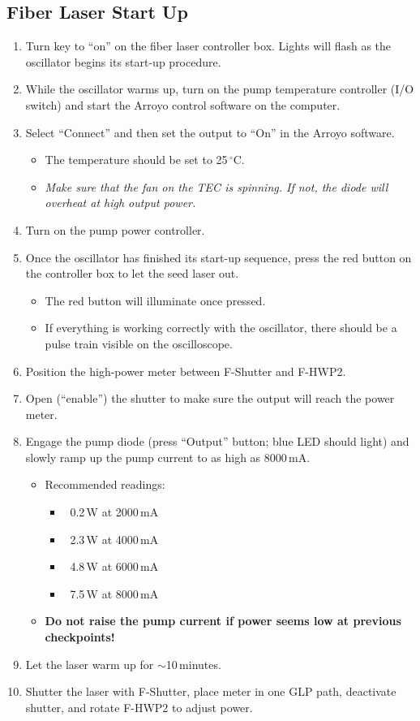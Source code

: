 \documentclass{article}
\begin{document}
\subsection{Fiber Laser Start Up}
\begin{enumerate}
  \item Turn key to ``on'' on the fiber laser controller box. Lights will flash as the oscillator begins its start-up procedure.
  \item While the oscillator warms up, turn on the pump temperature controller (I/O switch) and start the Arroyo control software on the computer.
  \item Select ``Connect'' and then set the output to ``On'' in the Arroyo software.
    \begin{itemize}
      \item The temperature should be set to 25\,$^\circ$C.
      \item \textit{Make sure that the fan on the TEC is spinning. If not, the diode will overheat at high output power.}
    \end{itemize}
  \item Turn on the pump power controller.
  \item Once the oscillator has finished its start-up sequence, press the red button on the controller box to let the seed laser out.
    \begin{itemize}
      \item The red button will illuminate once pressed.
      \item If everything is working correctly with the oscillator, there should be a pulse train visible on the oscilloscope.
    \end{itemize}
  \item Position the high-power meter between F-Shutter and F-HWP2.
  \item Open (``enable'') the shutter to make sure the output will reach the power meter.
  \item Engage the pump diode (press ``Output'' button; blue LED should light) and slowly ramp up the pump current to as high as 8000\,mA.
    \begin{itemize}
      \item Recommended readings:
      \begin{itemize}
        \item ~0.2\,W at 2000\,mA
        \item ~2.3\,W at 4000\,mA
        \item ~4.8\,W at 6000\,mA
        \item ~7.5\,W at 8000\,mA
      \end{itemize}
      \item \textbf{Do not raise the pump current if power seems low at previous checkpoints!}
    \end{itemize}
  \item Let the laser warm up for $\sim$10\,minutes.
  \item Shutter the laser with F-Shutter, place meter in one GLP path, deactivate shutter, and rotate F-HWP2 to adjust power.
\end{enumerate}
\end{document}
